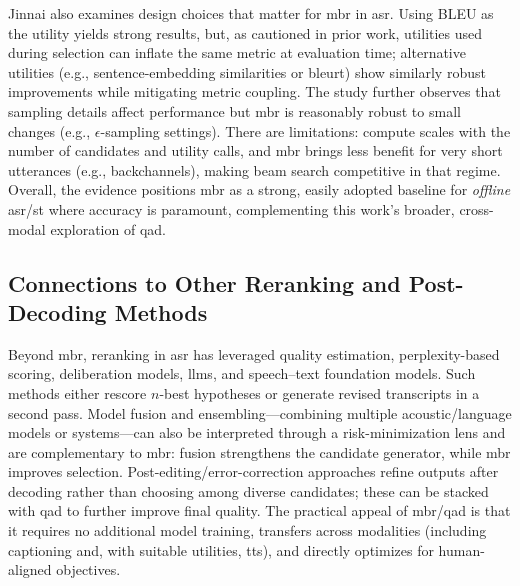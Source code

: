 Jinnai also examines design choices that matter for \gls{mbr} in \gls{asr}. Using BLEU as the utility yields strong results, but, as cautioned in prior work, utilities used during selection can inflate the same metric at evaluation time; alternative utilities (e.g., sentence-embedding similarities or \gls{bleurt}) show similarly robust improvements while mitigating metric coupling. The study further observes that sampling details affect performance but \gls{mbr} is reasonably robust to small changes (e.g., \(\epsilon\)-sampling settings). There are limitations: compute scales with the number of candidates and utility calls, and \gls{mbr} brings less benefit for very short utterances (e.g., backchannels), making beam search competitive in that regime. Overall, the evidence positions \gls{mbr} as a strong, easily adopted baseline for \emph{offline} \gls{asr}/\gls{st} where accuracy is paramount, complementing this work's broader, cross-modal exploration of \gls{qad}.

\subsection{Connections to Other Reranking and Post-Decoding Methods}
Beyond \gls{mbr}, reranking in \gls{asr} has leveraged quality estimation, perplexity-based scoring, deliberation models, \glspl{llm}, and speech–text foundation models. Such methods either rescore \(n\)-best hypotheses or generate revised transcripts in a second pass. Model fusion and ensembling—combining multiple acoustic/language models or systems—can also be interpreted through a risk-minimization lens and are complementary to \gls{mbr}: fusion strengthens the candidate generator, while \gls{mbr} improves selection. Post-editing/error-correction approaches refine outputs after decoding rather than choosing among diverse candidates; these can be stacked with \gls{qad} to further improve final quality. The practical appeal of \gls{mbr}/\gls{qad} is that it requires no additional model training, transfers across modalities (including captioning and, with suitable utilities, \gls{tts}), and directly optimizes for human-aligned objectives.
\fi